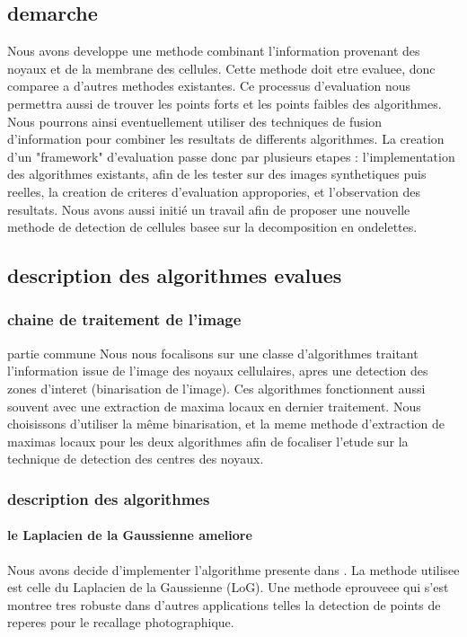\subsection{demarche}

Nous avons developpe une methode combinant l'information provenant des noyaux et de la membrane des cellules. Cette methode doit etre evaluee, donc comparee a d'autres methodes existantes. Ce processus d'evaluation nous permettra aussi de trouver les points forts et les points faibles des algorithmes. Nous pourrons ainsi eventuellement utiliser des techniques de fusion d'information pour combiner les resultats de differents algorithmes.
La creation d'un "framework" d'evaluation passe donc par plusieurs etapes : l'implementation des algorithmes existants, afin de les tester sur des images synthetiques puis reelles, la creation de criteres d'evaluation appropories, et l'observation des resultats. Nous avons aussi initié un travail afin de proposer une nouvelle methode de detection de cellules basee sur la decomposition en ondelettes.


\subsection {description des algorithmes evalues}



\subsubsection{chaine de traitement de l'image}

partie commune
Nous nous focalisons sur une classe d'algorithmes traitant l'information issue de l'image des noyaux cellulaires, apres une detection des zones d'interet (binarisation de l'image). Ces algorithmes fonctionnent aussi souvent avec une extraction de maxima locaux en dernier traitement.
Nous choisissons d'utiliser la même binarisation, et la meme methode d'extraction de maximas locaux pour les deux algorithmes afin de focaliser l'etude sur la technique de detection des centres des noyaux.

\subsubsection{description des algorithmes}
\paragraph{le Laplacien de la Gaussienne ameliore}
Nous avons decide d'implementer l'algorithme presente dans \cite{al2009improved}. La methode utilisee est celle du Laplacien de la Gaussienne (LoG). Une methode eprouveee qui s'est montree tres robuste dans d'autres applications telles la detection de points de reperes pour le recallage photographique.



